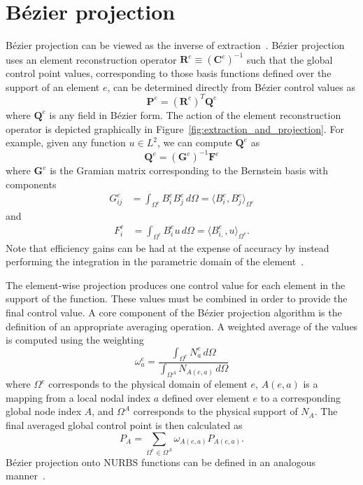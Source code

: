 \documentclass{article}
\newcommand{\Bezier}{{B\'{e}zier} }
\begin{document}
\section{B\'ezier projection}
\label{sec:bproject}

B\'{e}zier projection can be viewed as the inverse of extraction~\cite{thomas_bezier_2015}. B\'ezier projection uses an element reconstruction operator $\mathbf{R}^e\equiv(\mathbf{C}^e)^{-1}$ such that the global control point values, corresponding to those basis functions defined over the support of an element $e$, can be determined directly from \Bezier control values as
\begin{equation}
\mathbf{P}^e=(\mathbf{R}^e)^T\mathbf{Q}^e
\end{equation}
where $\mathbf{Q}^e$ is any field in B\'ezier form. The action of the element reconstruction operator is depicted graphically in Figure~\ref{fig:extraction_and_projection}. For example, given any function $u \in L^2$, we can compute $\mathbf{Q}^e$ as
\begin{equation}
\mathbf{Q}^e=(\mathbf{G}^e)^{-1}\mathbf{F}^e
\label{eq:element-Qi}
\end{equation}
where $\mathbf{G}^e$ is the Gramian matrix corresponding to the Bernstein basis with components
\begin{align}
  {G}_{ij}^e &= \int_{\Omega^e} B^e_i B^e_j \, d\Omega =\langle{B^e_{i},B^e_{j}}\rangle_{\Omega^e}
\end{align}
and
\begin{align}
  {F}^e_i &=  \int_{\Omega^e} B^e_i u \, d\Omega = \langle{B^e_{i,},u}\rangle_{\Omega^e}.
\end{align}
Note that efficiency gains can be had at the expense of accuracy by instead performing the integration in the parametric domain of the element~\cite{thomas_bezier_2015}. 

The element-wise projection produces one control value for each element in the support of the function.  These values must be combined in order to provide the final control value.  A core component of the B\'ezier projection algorithm is the definition of an appropriate averaging operation.  A weighted average of the values is computed using the weighting
\begin{equation}\label{eqn:Bezier_weight}
\omega_a^e=\dfrac{\int_{\Omega^e} N_{a}^e \, d\Omega}{\int_{\Omega^A} N_{A(e,a)} \, d\Omega}
\end{equation}
where $\Omega^e$ corresponds to the physical domain of element $e$, $A(e,a)$ is a mapping from a local nodal index $a$ defined over element $e$ to a corresponding global node index $A$, and $\Omega^A$ corresponds to the physical support of $N_A$. The final averaged global control point is then calculated as
\begin{equation}
P_A=\sum_{\Omega^e\in \Omega^A } \omega_{A(e,a)} P_{A(e,a)}.
\end{equation}
B\'ezier projection onto NURBS functions can be defined in an analogous manner~\cite{thomas_bezier_2015}.
\end{document}

